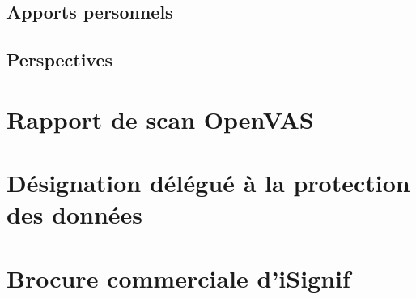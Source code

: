 \documentclass[]{report}
\begin{document}

  \section{Apports personnels}


  \section{Perspectives}



\begin{appendix}
    \chapter{Rapport de scan OpenVAS}\label{apx:openvas_report}
    

    \chapter{Désignation délégué
à la protection des données}\label{apx:dpo}
    

    \chapter{Brocure commerciale d'iSignif}\label{apx:brochure}
    
\end{appendix}
\end{document}
